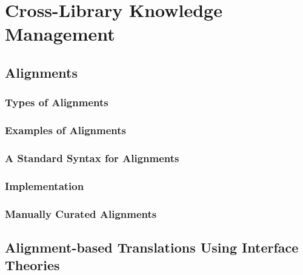 \documentclass[a4paper,11pt]{book}
\begin{document}
\part{Cross-Library Knowledge Management}\label{ch:crosslib} %


\chapter{Alignments}\label{sec:crosslib:alignments}


\section{Types of Alignments}\label{sec:crosslib:alignments:types}


% 

\section{Examples of Alignments}\label{sec:crosslib:alignments:examples}


\section{A Standard Syntax for Alignments}


\section{Implementation}\label{sec:crosslib:alignments:system}


\section{Manually Curated Alignments}\label{sec:crosslib:alignments:manually}



\chapter{Alignment-based Translations Using Interface Theories}\label{sec:crosslib:translate}

\end{document}
